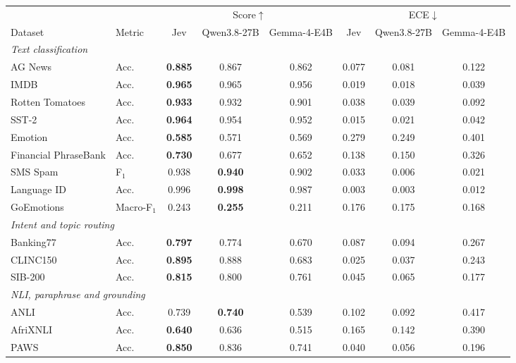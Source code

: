 \begin{tabular}{l l c c c c c c }
    \toprule
    & & \multicolumn{3}{c}{Score$\uparrow$} & \multicolumn{3}{c}{ECE$\downarrow$} \\
    \cmidrule(lr){3-5} \cmidrule(lr){6-8}
    Dataset & Metric & Jev & Qwen3.8-27B & Gemma-4-E4B & Jev & Qwen3.8-27B & Gemma-4-E4B \\
    \midrule
    \multicolumn{8}{l}{\textit{Text classification}} \\
    AG News & Acc. & \textbf{0.885} & 0.867 & 0.862 & 0.077 & 0.081 & 0.122 \\
    \rowcolor{gray!10}IMDB & Acc. & \textbf{0.965} & 0.965 & 0.956 & 0.019 & 0.018 & 0.039 \\
    Rotten Tomatoes & Acc. & \textbf{0.933} & 0.932 & 0.901 & 0.038 & 0.039 & 0.092 \\
    \rowcolor{gray!10}SST-2 & Acc. & \textbf{0.964} & 0.954 & 0.952 & 0.015 & 0.021 & 0.042 \\
    Emotion & Acc. & \textbf{0.585} & 0.571 & 0.569 & 0.279 & 0.249 & 0.401 \\
    \rowcolor{gray!10}Financial PhraseBank & Acc. & \textbf{0.730} & 0.677 & 0.652 & 0.138 & 0.150 & 0.326 \\
    SMS Spam & F$_\text{1}$ & 0.938 & \textbf{0.940} & 0.902 & 0.033 & 0.006 & 0.021 \\
    \rowcolor{gray!10}Language ID & Acc. & 0.996 & \textbf{0.998} & 0.987 & 0.003 & 0.003 & 0.012 \\
    GoEmotions & Macro-F$_\text{1}$ & 0.243 & \textbf{0.255} & 0.211 & 0.176 & 0.175 & 0.168 \\
    \midrule
    \multicolumn{8}{l}{\textit{Intent and topic routing}} \\
    Banking77 & Acc. & \textbf{0.797} & 0.774 & 0.670 & 0.087 & 0.094 & 0.267 \\
    \rowcolor{gray!10}CLINC150 & Acc. & \textbf{0.895} & 0.888 & 0.683 & 0.025 & 0.037 & 0.243 \\
    SIB-200 & Acc. & \textbf{0.815} & 0.800 & 0.761 & 0.045 & 0.065 & 0.177 \\
    \midrule
    \multicolumn{8}{l}{\textit{NLI, paraphrase and grounding}} \\
    ANLI & Acc. & 0.739 & \textbf{0.740} & 0.539 & 0.102 & 0.092 & 0.417 \\
    \rowcolor{gray!10}AfriXNLI & Acc. & \textbf{0.640} & 0.636 & 0.515 & 0.165 & 0.142 & 0.390 \\
    PAWS & Acc. & \textbf{0.850} & 0.836 & 0.741 & 0.040 & 0.056 & 0.196 \\

\end{tabular}
